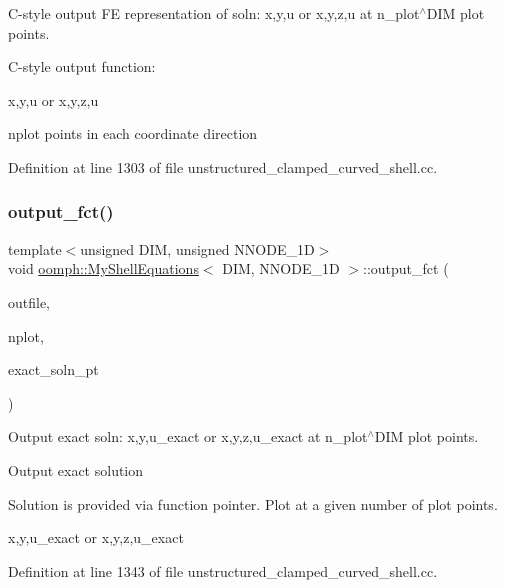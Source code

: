 C-\/style output FE representation of soln\+: x,y,u or x,y,z,u at n\+\_\+plot$^\wedge$\+D\+IM plot points. 

C-\/style output function\+:

x,y,u or x,y,z,u

nplot points in each coordinate direction 

Definition at line 1303 of file unstructured\+\_\+clamped\+\_\+curved\+\_\+shell.\+cc.

\mbox{\label{classoomph_1_1MyShellEquations_a882f6447d8e204962a3f2a350c6315c4}} 
\subsubsection{\texorpdfstring{output\+\_\+fct()}{output\_fct()}\hspace{0.1cm}{\footnotesize\ttfamily [1/2]}}
{\footnotesize\ttfamily template$<$unsigned D\+IM, unsigned N\+N\+O\+D\+E\+\_\+1D$>$ \\
void \hyperlink{classoomph_1_1MyShellEquations}{oomph\+::\+My\+Shell\+Equations}$<$ D\+IM, N\+N\+O\+D\+E\+\_\+1D $>$\+::output\+\_\+fct (\begin{DoxyParamCaption}\item[{std\+::ostream \&}]{outfile,  }\item[{const unsigned \&}]{nplot,  }\item[{Finite\+Element\+::\+Steady\+Exact\+Solution\+Fct\+Pt}]{exact\+\_\+soln\+\_\+pt }\end{DoxyParamCaption})}



Output exact soln\+: x,y,u\+\_\+exact or x,y,z,u\+\_\+exact at n\+\_\+plot$^\wedge$\+D\+IM plot points. 

Output exact solution

Solution is provided via function pointer. Plot at a given number of plot points.

x,y,u\+\_\+exact or x,y,z,u\+\_\+exact 

Definition at line 1343 of file unstructured\+\_\+clamped\+\_\+curved\+\_\+shell.\+cc.

\mbox{\label{classoomph_1_1MyShellEquations_a7022e91eaf4bff9044e46549bbe0c3f5}} 
